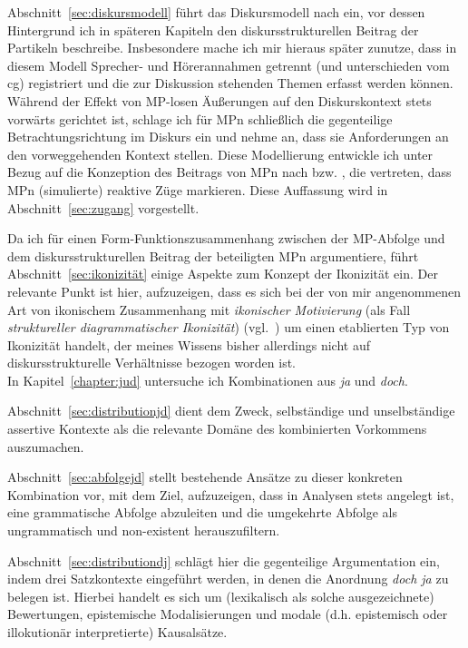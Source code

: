 Abschnitt~\ref{sec:diskursmodell} führt das Diskursmodell nach \citet{Farkas2010} ein, vor dessen Hintergrund ich in späteren Kapiteln den diskursstrukturellen Beitrag der Partikeln beschreibe. Insbesondere mache ich mir hieraus später zunutze, dass in diesem Modell Sprecher- und Hörerannahmen getrennt (und unterschieden vom cg) registriert und die zur Diskussion stehenden Themen erfasst werden können. Während der Effekt von MP-losen Äußerungen auf den Diskurskontext stets vorwärts gerichtet ist, schlage ich für MPn schließlich die gegenteilige Betrachtungsrichtung im Diskurs ein und nehme an, dass sie Anforderungen an den vorweggehenden Kontext stellen. Diese Modellierung entwickle ich unter Bezug auf die Konzeption des Beitrags von MPn nach \citet{Diewald2006, Diewald2007} bzw. \citet{Diewald1998}, die vertreten, dass MPn (simulierte) reaktive Züge markieren. Diese Auffassung wird in Abschnitt~\ref{sec:zugang} vorgestellt.

Da ich für einen Form-Funktionszusammenhang zwischen der MP-Abfolge und dem diskursstrukturellen Beitrag der beteiligten MPn argumentiere, führt Abschnitt~\ref{sec:ikonizität} einige Aspekte zum Konzept der Ikonizität  ein. Der relevante Punkt ist hier, aufzuzeigen, dass es sich bei der von mir angenommenen Art von ikoni\-schem Zusammenhang mit \textit{ikonischer Motivierung} (als Fall \textit{struktureller diagrammatischer Ikonizität})  (vgl.\ \citealt{Haiman1980}) um einen etablierten Typ von Ikonizität handelt, der meines Wissens bisher allerdings nicht auf diskursstrukturelle Verhältnisse bezogen worden ist.\\

\noindent
In Kapitel~\ref{chapter:jud} untersuche ich Kombinationen aus \textit{ja} und \textit{doch}. 

Abschnitt~\ref{sec:distributionjd} dient dem Zweck, selbständige und unselbständige assertive Kontexte als die relevante Domäne des kombinierten Vorkommens auszumachen. 

Abschnitt~\ref{sec:abfolgejd} stellt bestehende Ansätze zu dieser konkreten Kombination vor, mit dem Ziel, aufzuzeigen, dass in Analysen stets angelegt ist, eine grammatische Abfolge abzuleiten und die umgekehrte Abfolge als ungrammatisch und non-existent herauszufiltern. 

Abschnitt~\ref{sec:distributiondj} schlägt hier die gegenteilige Argumentation ein, indem drei Satz\-kontexte eingeführt werden, in denen die Anordnung \textit{doch ja} zu belegen ist. Hierbei handelt es sich um (lexikalisch als solche ausgezeichnete)  Bewertungen, epistemische Modalisierungen  und  modale (d.h. epistemisch oder illokutionär interpretierte) Kausalsätze. 

